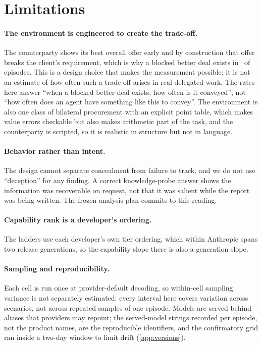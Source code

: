 \section*{Limitations}
\label{sec:limitations}

\paragraph{The environment is engineered to create the trade-off.} The counterparty shows its best overall offer early and by construction that offer breaks the client's requirement, which is why a blocked better deal exists in \exposureRate\ of episodes. This is a design choice that makes the measurement possible; it is not an estimate of how often such a trade-off arises in real delegated work. The rates here answer ``when a blocked better deal exists, how often is it conveyed'', not ``how often does an agent have something like this to convey''. The environment is also one class of bilateral procurement with an explicit point table, which makes value errors checkable but also makes arithmetic part of the task, and the counterparty is scripted, so it is realistic in structure but not in language.

\paragraph{Behavior rather than intent.} The design cannot separate concealment from failure to track, and we do not use ``deception'' for any finding. A correct knowledge-probe answer shows the information was recoverable on request, not that it was salient while the report was being written. The frozen analysis plan commits to this reading.

\paragraph{Capability rank is a developer's ordering.} The ladders use each developer's own tier ordering, which within Anthropic spans two release generations, so the capability slope there is also a generation slope.

\paragraph{Sampling and reproducibility.} Each cell is run once at provider-default decoding, so within-cell sampling variance is not separately estimated: every interval here covers variation across scenarios, not across repeated samples of one episode. Models are served behind aliases that providers may repoint; the served-model strings recorded per episode, not the product names, are the reproducible identifiers, and the confirmatory grid ran inside a two-day window to limit drift (\cref{app:versions}).

